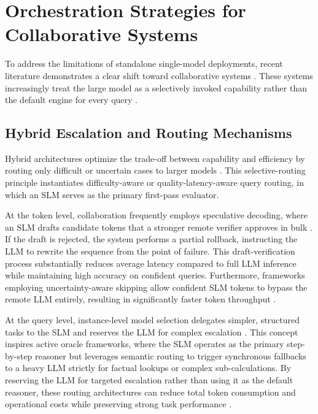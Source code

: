 \section{Orchestration Strategies for Collaborative Systems}
To address the limitations of standalone single-model deployments, recent literature demonstrates a clear shift toward collaborative systems \cite{chen2025collabmech, wang2025collabperf}. These systems increasingly treat the large model as a selectively invoked capability rather than the default engine for every query \cite{chen2025collabmech, wang2025collabperf}.

\subsection{Hybrid Escalation and Routing Mechanisms}
Hybrid architectures optimize the trade-off between capability and efficiency by routing only difficult or uncertain cases to larger models \cite{hao2024hybrid, qwqrouting2025}. This selective-routing principle instantiates difficulty-aware or quality-latency-aware query routing, in which an SLM serves as the primary first-pass evaluator.

At the token level, collaboration frequently employs speculative decoding, where an SLM drafts candidate tokens that a stronger remote verifier approves in bulk \cite{hao2024hybrid, oh2025uncertainty}. If the draft is rejected, the system performs a partial rollback, instructing the LLM to rewrite the sequence from the point of failure. This draft-verification process substantially reduces average latency compared to full LLM inference while maintaining high accuracy on confident queries. Furthermore, frameworks employing uncertainty-aware skipping allow confident SLM tokens to bypass the remote LLM entirely, resulting in significantly faster token throughput \cite{oh2025uncertainty, fedhlm2025}.

At the query level, instance-level model selection delegates simpler, structured tasks to the SLM and reserves the LLM for complex escalation \cite{rethinkllm2025}. This concept inspires active oracle frameworks, where the SLM operates as the primary step-by-step reasoner but leverages semantic routing to trigger synchronous fallbacks to a heavy LLM strictly for factual lookups or complex sub-calculations. By reserving the LLM for targeted escalation rather than using it as the default reasoner, these routing architectures can reduce total token consumption and operational costs while preserving strong task performance \cite{qwqrouting2025, alabbasi2024teleoracle}.

